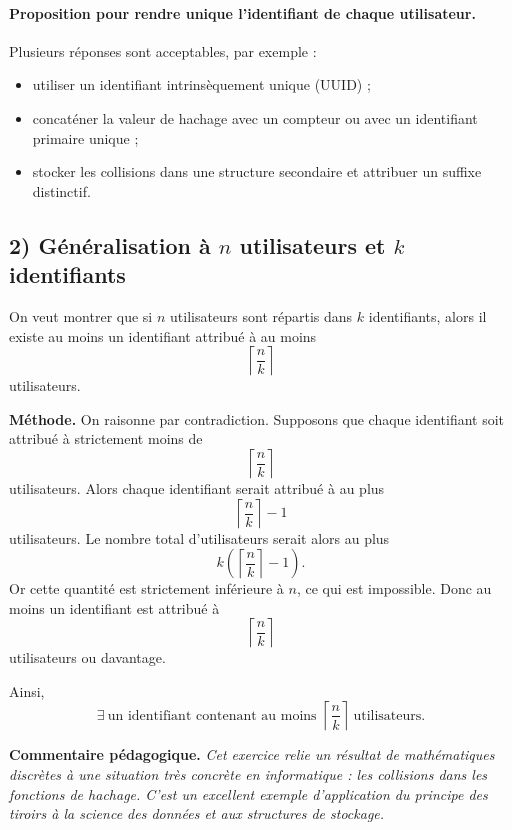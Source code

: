 \documentclass[12pt,a4paper]{article}
\newenvironment{pedago}
{\par\smallskip\noindent\textbf{Commentaire pédagogique. }\itshape}
{\par\smallskip}
\newenvironment{methode}
{\par\smallskip\noindent\textbf{Méthode. }}
{\par\smallskip}
\begin{document}
\paragraph{Proposition pour rendre unique l'identifiant de chaque utilisateur.}
Plusieurs réponses sont acceptables, par exemple :
\begin{itemize}[leftmargin=1.2cm]
    \item utiliser un identifiant intrinsèquement unique (UUID) ;
    \item concaténer la valeur de hachage avec un compteur ou avec un identifiant primaire unique ;
    \item stocker les collisions dans une structure secondaire et attribuer un suffixe distinctif.
\end{itemize}

\subsection*{2) Généralisation à $n$ utilisateurs et $k$ identifiants}

On veut montrer que si $n$ utilisateurs sont répartis dans $k$ identifiants, alors il existe au moins un identifiant attribué à au moins
\[
\left\lceil \frac{n}{k}\right\rceil
\]
utilisateurs.

\begin{methode}
On raisonne par contradiction. Supposons que chaque identifiant soit attribué à strictement moins de
\[
\left\lceil \frac{n}{k}\right\rceil
\]
utilisateurs. Alors chaque identifiant serait attribué à au plus
\[
\left\lceil \frac{n}{k}\right\rceil -1
\]
utilisateurs. Le nombre total d'utilisateurs serait alors au plus
\[
k\left(\left\lceil \frac{n}{k}\right\rceil -1\right).
\]
Or cette quantité est strictement inférieure à $n$, ce qui est impossible. Donc au moins un identifiant est attribué à
\[
\left\lceil \frac{n}{k}\right\rceil
\]
utilisateurs ou davantage.
\end{methode}

Ainsi,
\[
\boxed{\exists\ \text{un identifiant contenant au moins }\left\lceil \frac{n}{k}\right\rceil\ \text{utilisateurs}.}
\]

\begin{pedago}
Cet exercice relie un résultat de mathématiques discrètes à une situation très concrète en informatique : les collisions dans les fonctions de hachage. C'est un excellent exemple d'application du principe des tiroirs à la science des données et aux structures de stockage.
\end{pedago}
\end{document}
